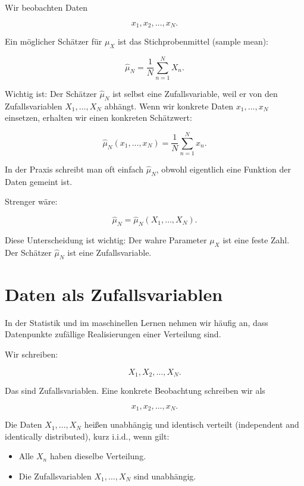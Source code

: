 Wir beobachten Daten

\[
    x_1,x_2,\dots,x_N.
\]

Ein möglicher Schätzer für \(\mu_X\) ist das Stichprobenmittel (sample mean):

\[
    \hat{\mu}_N
    =
    \frac{1}{N}
    \sum_{n=1}^{N}
    X_n.
\]

Wichtig ist:
Der Schätzer \(\hat{\mu}_N\) ist selbst eine Zufallsvariable, weil er von den Zufallsvariablen \(X_1,\dots,X_N\) abhängt.
Wenn wir konkrete Daten \(x_1,\dots,x_N\) einsetzen, erhalten wir einen konkreten Schätzwert:

\[
    \hat{\mu}_N(x_1,\dots,x_N)
    =
    \frac{1}{N}
    \sum_{n=1}^{N}
    x_n.
\]

\begin{notebox}
In der Praxis schreibt man oft einfach \(\hat{\mu}_N\), obwohl eigentlich eine Funktion der Daten gemeint ist.

Strenger wäre:

\[
    \hat{\mu}_N
    =
    \hat{\mu}_N(X_1,\dots,X_N).
\]

Diese Unterscheidung ist wichtig:
Der wahre Parameter \(\mu_X\) ist eine feste Zahl.
Der Schätzer \(\hat{\mu}_N\) ist eine Zufallsvariable.
\end{notebox}

\section{Daten als Zufallsvariablen}

In der Statistik und im maschinellen Lernen nehmen wir häufig an, dass Datenpunkte zufällige Realisierungen einer Verteilung sind.

Wir schreiben:

\[
    X_1,X_2,\dots,X_N.
\]

Das sind Zufallsvariablen.
Eine konkrete Beobachtung schreiben wir als

\[
    x_1,x_2,\dots,x_N.
\]

\begin{definitionbox}
Die Daten \(X_1,\dots,X_N\) heißen unabhängig und identisch verteilt (independent and identically distributed), kurz i.i.d., wenn gilt:

\begin{itemize}
    \item Alle \(X_n\) haben dieselbe Verteilung.
    \item Die Zufallsvariablen \(X_1,\dots,X_N\) sind unabhängig.
\end{itemize}
\end{definitionbox}

